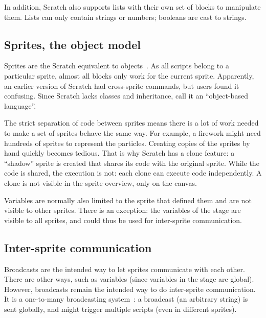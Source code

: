 \documentclass[../main]{subfiles}
\begin{document}
In addition, Scratch also supports lists with their own set of blocks to manipulate them.
Lists can only contain strings or numbers; booleans are cast to strings.

\subsection{Sprites, the object model}\label{subsec:sprites-the-object-model}

Sprites are the Scratch equivalent to objects~\autocite{maloneyScratchProgrammingLanguage2010}.
As all scripts belong to a particular sprite, almost all blocks only work for the current sprite.
Apparently, an earlier version of Scratch had cross-sprite commands, but users found it confusing.
Since Scratch lacks classes and inheritance, \citeauthor{maloneyScratchProgrammingLanguage2010} call it an ``object-based language''.

The strict separation of code between sprites means there is a lot of work needed to make a set of sprites behave the same way.
For example, a firework might need hundreds of sprites to represent the particles.
Creating copies of the sprites by hand quickly becomes tedious.
That is why Scratch has a clone feature: a ``shadow'' sprite is created that shares its code with the original sprite.
While the code is shared, the execution is not: each clone can execute code independently.
A clone is not visible in the sprite overview, only on the canvas.

Variables are normally also limited to the sprite that defined them and are not visible to other sprites.
There is an exception: the variables of the stage are visible to all sprites, and could thus be used for inter-sprite communication.

\subsection{Inter-sprite communication}\label{subsec:intersprite-communications}

\textcolor{screvent}{Broadcasts} are the intended way to let sprites communicate with each other.
There are other ways, such as variables (since variables in the stage are global).
However, broadcasts remain the intended way to do inter-sprite communication.
It is a one-to-many broadcasting system~\autocite{maloneyScratchProgrammingLanguage2010}: a broadcast (an arbitrary string) is sent globally, and might trigger multiple scripts (even in different sprites).
\end{document}
